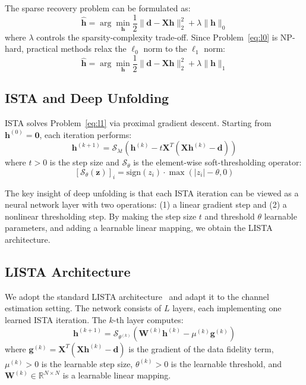 \documentclass[a4paper,fleqn]{cas-sc}
\begin{document}
The sparse recovery problem can be formulated as:
\begin{equation}\label{eq:l0}
\hat{\mathbf{h}} = \arg\min_{\mathbf{h}} \frac{1}{2} \|\mathbf{d} - \mathbf{X}\mathbf{h}\|_2^2 + \lambda \|\mathbf{h}\|_0
\end{equation}
where $\lambda$ controls the sparsity-complexity trade-off. Since Problem~\eqref{eq:l0} is NP-hard, practical methods relax the $\ell_0$ norm to the $\ell_1$ norm:
\begin{equation}\label{eq:l1}
\hat{\mathbf{h}} = \arg\min_{\mathbf{h}} \frac{1}{2} \|\mathbf{d} - \mathbf{X}\mathbf{h}\|_2^2 + \lambda \|\mathbf{h}\|_1
\end{equation}

\subsection{ISTA and Deep Unfolding}

ISTA solves Problem~\eqref{eq:l1} via proximal gradient descent. Starting from $\mathbf{h}^{(0)} = \mathbf{0}$, each iteration performs:
\begin{equation}\label{eq:ista}
\mathbf{h}^{(k+1)} = \mathcal{S}_{\lambda t}\left(\mathbf{h}^{(k)} - t \mathbf{X}^T(\mathbf{X}\mathbf{h}^{(k)} - \mathbf{d})\right)
\end{equation}
where $t > 0$ is the step size and $\mathcal{S}_\theta$ is the element-wise soft-thresholding operator:
\begin{equation}\label{eq:soft_threshold}
[\mathcal{S}_\theta(\mathbf{z})]_i = \text{sign}(z_i) \cdot \max(|z_i| - \theta, 0)
\end{equation}

The key insight of deep unfolding is that each ISTA iteration can be viewed as a neural network layer with two operations: (1) a linear gradient step and (2) a nonlinear thresholding step. By making the step size $t$ and threshold $\theta$ learnable parameters, and adding a learnable linear mapping, we obtain the LISTA architecture.

\subsection{LISTA Architecture}

We adopt the standard LISTA architecture~\citep{gregor2010learning} and adapt it to the channel estimation setting. The network consists of $L$ layers, each implementing one learned ISTA iteration. The $k$-th layer computes:
\begin{equation}\label{eq:lista_layer}
\mathbf{h}^{(k+1)} = \mathcal{S}_{\theta^{(k)}}\left(\mathbf{W}^{(k)} \mathbf{h}^{(k)} - \mu^{(k)} \mathbf{g}^{(k)}\right)
\end{equation}
where $\mathbf{g}^{(k)} = \mathbf{X}^T(\mathbf{X}\mathbf{h}^{(k)} - \mathbf{d})$ is the gradient of the data fidelity term, $\mu^{(k)} > 0$ is the learnable step size, $\theta^{(k)} > 0$ is the learnable threshold, and $\mathbf{W}^{(k)} \in \mathbb{R}^{N \times N}$ is a learnable linear mapping.
\end{document}
